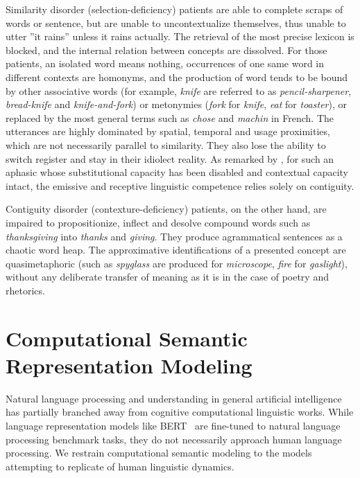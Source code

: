 Similarity disorder (selection-deficiency) patients are able to complete scraps of words or sentence, but are unable to uncontextualize themselves, thus unable to utter ''it rains'' unless it rains actually. The retrieval of the most precise lexicon is blocked, and the internal relation between concepts are dissolved. For those patients, an isolated word means nothing, occurrences of one same word in different contexts are homonyms, and the production of word tends to be bound by other associative words (for example, \emph{knife} are referred to as \emph{pencil-sharpener}, \emph{bread-knife} and \emph{knife-and-fork}) or metonymies (\emph{fork} for \emph{knife}, \emph{eat} for \emph{toaster}), or replaced by the most general terms such as \emph{chose} and \emph{machin} in French. The utterances are highly dominated by spatial, temporal and usage proximities, which are not necessarily parallel to similarity. They also lose the ability to switch register and stay in their idiolect reality. As remarked by \citeauthor{jakobsonFundamentalsLanguage1963}, for such an aphasic whose substitutional capacity has been disabled and contextual capacity intact, the emissive and receptive linguistic competence relies solely on contiguity. 

Contiguity disorder (contexture-deficiency) patients, on the other hand, are impaired to propositionize, inflect and desolve compound words such as \emph{thanksgiving} into \emph{thanks} and \emph{giving}. They produce agrammatical sentences as a chaotic word heap. The approximative identifications of a presented concept are quasimetaphoric (such as \emph{spyglass} are produced for \emph{microscope}, \emph{fire} for \emph{gaslight}), without any deliberate transfer of meaning as it is in the case of poetry and rhetorics. 


\section{Computational Semantic Representation Modeling}

Natural language processing and understanding in general artificial intelligence has partially branched away from cognitive computational linguistic works. While language representation models like BERT~\parencite{devlinBERTPretrainingDeep2018} are fine-tuned to natural language processing benchmark tasks, they do not necessarily approach human language processing. We restrain computational semantic modeling to the models attempting to replicate of human linguistic dynamics. 


